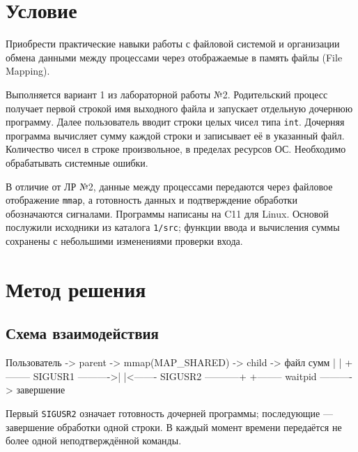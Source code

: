 \documentclass[12pt,a4paper]{article}
\begin{document}
\setlength{\emergencystretch}{3em}

\section{Условие}
Приобрести практические навыки работы с файловой системой и организации обмена данными между процессами через отображаемые в память файлы (File Mapping).

Выполняется вариант 1 из лабораторной работы №2. Родительский процесс получает первой строкой имя выходного файла и запускает отдельную дочернюю программу. Далее пользователь вводит строки целых чисел типа \texttt{int}. Дочерняя программа вычисляет сумму каждой строки и записывает её в указанный файл. Количество чисел в строке произвольное, в пределах ресурсов ОС. Необходимо обрабатывать системные ошибки.

В отличие от ЛР №2, данные между процессами передаются через файловое отображение \texttt{mmap}, а готовность данных и подтверждение обработки обозначаются сигналами. Программы написаны на C11 для Linux. Основой послужили исходники из каталога \texttt{1/src}; функции ввода и вычисления суммы сохранены с небольшими изменениями проверки входа.

\section{Метод решения}
\subsection{Схема взаимодействия}
\begin{terminal}
Пользователь -> parent -> mmap(MAP_SHARED) -> child -> файл сумм
                  |                           |
                  +-------- SIGUSR1 ---------->|
                  |<------- SIGUSR2 -----------+
                  +-------- waitpid ----------> завершение
\end{terminal}
Первый \texttt{SIGUSR2} означает готовность дочерней программы; последующие --- завершение обработки одной строки. В каждый момент времени передаётся не более одной неподтверждённой команды.
\end{document}
